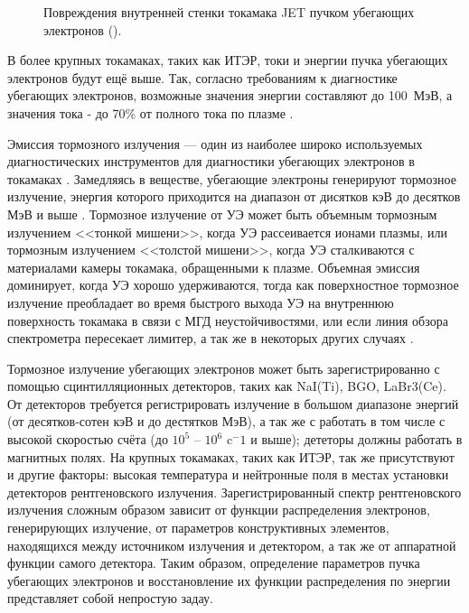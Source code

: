 \begin{figure}[ht]
  \caption{ Повреждения внутренней стенки токамака JET пучком убегающих электронов (\autocite{Matthews2016}).}
  \label{fig:electrons-wall}
\end{figure}

В более крупных токамаках, таких как ИТЭР, токи и энергии пучка убегающих электронов будут ещё выше. Так, согласно требованиям к диагностике убегающих электронов, возможные значения энергии составляют до 100~МэВ, а значения тока - до 70\% от полного тока по плазме \autocite{Donne2007}. 

Эмиссия тормозного излучения --- один из наиболее широко используемых диагностических инструментов для диагностики убегающих электронов в токамаках \autocite{Breizman2019,Knoepfel1979}. Замедляясь в веществе, убегающие электроны генерируют тормозное излучение, энергия которого приходится на диапазон от дисятков кэВ до десятков МэВ и выше \autocite{Shevelev2014}. Тормозное излучение от УЭ может быть объемным тормозным излучением <<тонкой мишени>>, когда УЭ рассеивается ионами плазмы, или тормозным излучением <<толстой мишени>>, когда УЭ сталкиваются с материалами камеры токамака, обращенными к плазме. Объемная эмиссия доминирует, когда УЭ хорошо удерживаются, тогда как поверхностное тормозное излучение преобладает во время быстрого выхода УЭ на внутреннюю поверхность токамака в связи с МГД неустойчивостями, или если линия обзора спектрометра пересекает лимитер, а так же в некоторых других случаях \autocite{Breizman2019}. 

Тормозное излучение убегающих электронов может быть зарегистрированно с помощью сцинтилляционных детекторов, таких как NaI(Ti), BGO, LaBr3(Ce). От детекторов требуется регистрировать излучение в большом диапазоне энергий (от десятков-сотен кэВ и до дестятков МэВ), а так же с работать в том числе с высокой скоростью счёта (до $10^5$ -- $10^6$ c${}^-1$ и выше); дететоры должны работать в магнитных полях. На крупных токамаках, таких как ИТЭР, так же присутствуют и другие факторы: высокая температура и нейтронные поля в местах установки детекторов рентгеновского излучения. Зарегистрированный спектр рентгеновского излучения сложным образом зависит от функции распределения электронов, генерирующих излучение, от параметров конструктивных элементов, находящихся между источником излучения и детектором, а так же от аппаратной функции самого детектора. Таким образом, определение параметров пучка убегающих электронов и восстановление их функции распределения по энергии представляет собой непростую задау. 

